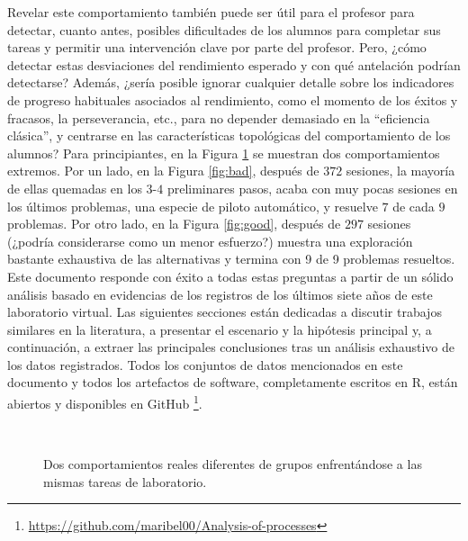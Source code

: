 Revelar este comportamiento también puede ser útil para el profesor para detectar, cuanto antes, posibles dificultades de los alumnos para completar sus tareas y permitir una intervención clave por parte del profesor. Pero, ¿cómo detectar estas desviaciones del rendimiento esperado y con qué antelación podrían detectarse? Además, ¿sería posible ignorar cualquier detalle sobre los indicadores de progreso habituales asociados al rendimiento, como el momento de los éxitos y fracasos, la perseverancia, etc., para no depender demasiado en la ``eficiencia clásica'', y centrarse en las características topológicas del comportamiento de los alumnos? Para principiantes, en la Figura \ref{fig:extreme} se muestran dos comportamientos extremos. Por un lado, en la Figura \ref{fig:bad}, después de $372$ sesiones, la mayoría de ellas quemadas en los $3$-$4$ preliminares pasos, acaba con muy pocas sesiones en los últimos problemas, una especie de piloto automático, y resuelve $7$ de cada $9$ problemas. Por otro lado, en la Figura \ref{fig:good}, después de $297$ sesiones (¿podría considerarse como un menor esfuerzo?) muestra una exploración bastante exhaustiva de las alternativas y termina con 9 de 9 problemas resueltos. Este
documento responde con éxito a todas estas preguntas a partir de un sólido análisis basado en evidencias de los registros de los últimos siete años de este laboratorio virtual. Las siguientes secciones están dedicadas a discutir trabajos similares en la literatura, a presentar el escenario y la hipótesis principal y, a continuación, a extraer las principales conclusiones tras un análisis exhaustivo de los datos registrados. Todos los conjuntos de datos mencionados en este documento y todos los artefactos de software, completamente escritos en R, están abiertos y disponibles en GitHub \footnote{\href{https://github.com/maribel00/Analysis-of-processes}{https://github.com/maribel00/Analysis-of-processes}}.

\begin{figure}[H]
\centering
{}\\
\caption{Dos comportamientos reales diferentes de grupos enfrentándose a las mismas tareas de laboratorio.}
\label{fig:extreme}
\end{figure}

